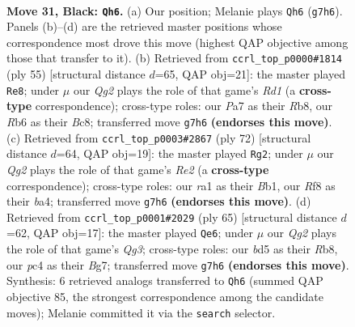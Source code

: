 \documentclass[11pt]{article}
\begin{document}
\clearpage

\begin{figure}[p]\centering
\begin{subfigure}{0.46\textwidth}\centering
\resizebox{\linewidth}{!}{%
\newchessgame
\chessboard[
  setfen={2b2r2/p5qk/Pr1pPp2/2pB3Q/2P5/6P1/4N2K/R4R2 b - - 1 31},
  showmover=false,
  pgfstyle=straightmove, color=movearrow, markmove={g7-h6}
]}
\caption{}
\end{subfigure}\hfill
\begin{subfigure}{0.46\textwidth}\centering
\resizebox{\linewidth}{!}{%
\newchessgame
\chessboard[
  setfen={1rbr2k1/6bp/3q2p1/QBNp1p2/P4P2/8/1P4P1/1K1R3R b - - 0 28},
  showmover=false,
  pgfstyle=straightmove, color=movearrow, markmove={d8-e8}
]}
\caption{}
\end{subfigure}
\\[4pt]
\begin{subfigure}{0.46\textwidth}\centering
\resizebox{\linewidth}{!}{%
\newchessgame
\chessboard[
  setfen={r5k1/1q3p2/2nBr1pP/3p4/b1pP1Q2/4P3/4R3/1BR3K1 w - - 3 37},
  showmover=false,
  pgfstyle=straightmove, color=movearrow, markmove={e2-g2}
]}
\caption{}
\end{subfigure}\hfill
\begin{subfigure}{0.46\textwidth}\centering
\resizebox{\linewidth}{!}{%
\newchessgame
\chessboard[
  setfen={1r4k1/5pbp/6q1/r3P3/3B3Q/p1P4P/6P1/R4R1K b - - 5 33},
  showmover=false,
  pgfstyle=straightmove, color=movearrow, markmove={g6-e6}
]}
\caption{}
\end{subfigure}
\caption{\textbf{Move 31, Black: \texttt{Qh6}.} (a) Our position; Melanie plays \texttt{Qh6} (\texttt{g7h6}). Panels (b)--(d) are the retrieved master positions whose correspondence most drove this move (highest QAP objective among those that transfer to it). (b) Retrieved from \texttt{ccrl\_top\_p0000\#1814} (ply 55) [structural distance $d$=65, QAP obj=21]: the master played \texttt{Re8}; under $\mu$ our \emph{Qg2} plays the role of that game's \emph{Rd1} (a \textbf{cross-type} correspondence); cross-type roles: our \emph{P}a7 as their \emph{R}b8, our \emph{R}b6 as their \emph{B}c8; transferred move \texttt{g7h6} \textbf{(endorses this move)}. (c) Retrieved from \texttt{ccrl\_top\_p0003\#2867} (ply 72) [structural distance $d$=64, QAP obj=19]: the master played \texttt{Rg2}; under $\mu$ our \emph{Qg2} plays the role of that game's \emph{Re2} (a \textbf{cross-type} correspondence); cross-type roles: our \emph{r}a1 as their \emph{B}b1, our \emph{R}f8 as their \emph{b}a4; transferred move \texttt{g7h6} \textbf{(endorses this move)}. (d) Retrieved from \texttt{ccrl\_top\_p0001\#2029} (ply 65) [structural distance $d$=62, QAP obj=17]: the master played \texttt{Qe6}; under $\mu$ our \emph{Qg2} plays the role of that game's \emph{Qg3}; cross-type roles: our \emph{b}d5 as their \emph{R}b8, our \emph{p}c4 as their \emph{B}g7; transferred move \texttt{g7h6} \textbf{(endorses this move)}. Synthesis: 6 retrieved analogs transferred to \texttt{Qh6} (summed QAP objective 85, the strongest correspondence among the candidate moves); Melanie committed it via the \texttt{search} selector.}
\label{fig:thought-m61}
\end{figure}
\end{document}
